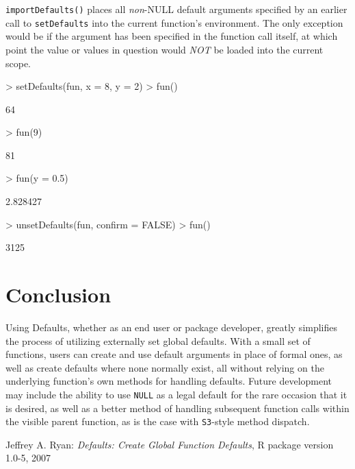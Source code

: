 \documentclass{article}
\begin{document}
\vspace{2mm}
\noindent
{\tt importDefaults()} places all {\it non}-NULL default
arguments specified by an earlier call to 
{\tt setDefaults} into the current function's environment.
The only exception would be if the argument has been specified
in the function call itself, at which point the value or values
in question would {\em NOT} be loaded into the current scope.

\begin{Schunk}
\begin{Sinput}
> setDefaults(fun, x = 8, y = 2)
> fun()
\end{Sinput}
\begin{Soutput}
[1] 64
\end{Soutput}
\begin{Sinput}
> fun(9)
\end{Sinput}
\begin{Soutput}
[1] 81
\end{Soutput}
\begin{Sinput}
> fun(y = 0.5)
\end{Sinput}
\begin{Soutput}
[1] 2.828427
\end{Soutput}
\begin{Sinput}
> unsetDefaults(fun, confirm = FALSE)
> fun()
\end{Sinput}
\begin{Soutput}
[1] 3125
\end{Soutput}
\end{Schunk}

\section{Conclusion}
Using {\sf Defaults}, whether as an end user or package developer,
greatly simplifies the process of utilizing externally set global
defaults. With a small set of functions, users can create and use
default arguments in place of formal ones, as well as create
defaults where none normally exist, all without relying on the underlying
function's own methods for handling defaults. Future development
may include the ability to use {\tt NULL} as a legal default for
the rare occasion that it is desired, as well as a better method of
handling subsequent function calls within the visible parent function,
as is the case with {\tt S3}-style method dispatch.

\begin{thebibliography}{99}
 Jeffrey A. Ryan:
\emph{Defaults: Create Global Function Defaults},
R package version 1.0-5, 2007
\end{thebibliography}
\end{document}
